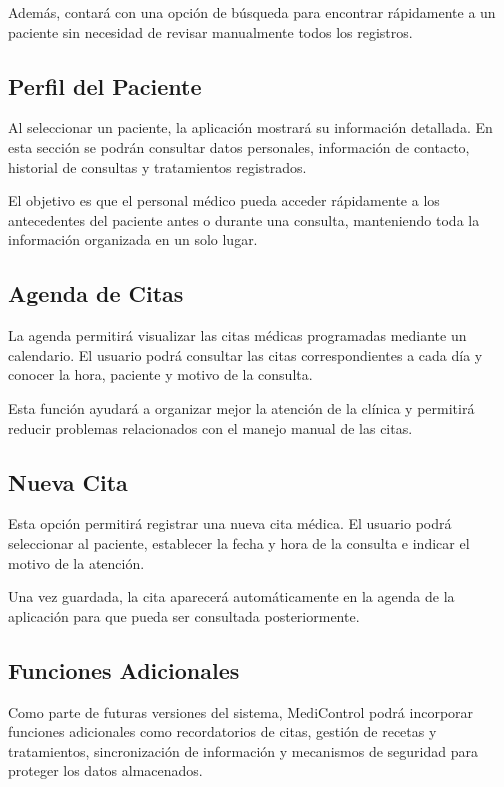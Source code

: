 \documentclass[stu,letterpaper,floatsintext,nolmodern,nofontenc]{apa7}
\begin{document}
Además, contará con una opción de búsqueda para encontrar rápidamente a un paciente sin necesidad de revisar manualmente todos los registros.

\subsection{Perfil del Paciente}

Al seleccionar un paciente, la aplicación mostrará su información detallada. En esta sección se podrán consultar datos personales, información de contacto, historial de consultas y tratamientos registrados.

El objetivo es que el personal médico pueda acceder rápidamente a los antecedentes del paciente antes o durante una consulta, manteniendo toda la información organizada en un solo lugar.

\subsection{Agenda de Citas}

La agenda permitirá visualizar las citas médicas programadas mediante un calendario. El usuario podrá consultar las citas correspondientes a cada día y conocer la hora, paciente y motivo de la consulta.

Esta función ayudará a organizar mejor la atención de la clínica y permitirá reducir problemas relacionados con el manejo manual de las citas.

\subsection{Nueva Cita}

Esta opción permitirá registrar una nueva cita médica. El usuario podrá seleccionar al paciente, establecer la fecha y hora de la consulta e indicar el motivo de la atención.

Una vez guardada, la cita aparecerá automáticamente en la agenda de la aplicación para que pueda ser consultada posteriormente.

\subsection{Funciones Adicionales}

Como parte de futuras versiones del sistema, MediControl podrá incorporar funciones adicionales como recordatorios de citas, gestión de recetas y tratamientos, sincronización de información y mecanismos de seguridad para proteger los datos almacenados.
\end{document}
